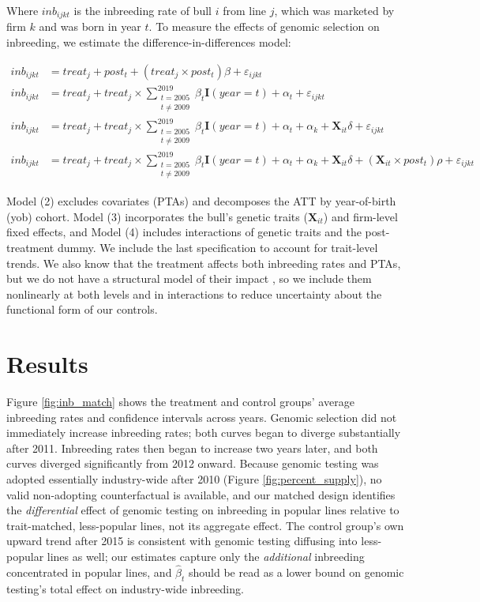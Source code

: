 \documentclass[12pt,letterpaper]{article}
\begin{document}
Where $inb_{ijkt}$ is the inbreeding rate of bull $i$ from line $j$, which was marketed by firm $k$ and was born in year $t$. To measure the effects of genomic selection on inbreeding, we estimate the difference-in-differences model:

\begin{align}
    inb_{ijkt} &= treat_{j}+post_{t}+(treat_{j}\times post_{t})\beta+\varepsilon_{ijkt}\tag{Model 1}\\
    inb_{ijkt} &= treat_{j}+treat_{j}\times\sum_{\substack{t=2005\\t \neq 2009}}^{2019}\beta_{t}\mathbf{I}(year=t)+\alpha_{t}+\varepsilon_{ijkt}\tag{Model 2}\\
    inb_{ijkt} &= treat_{j}+treat_{j}\times\sum_{\substack{t=2005\\t \neq 2009}}^{2019}\beta_{t}\mathbf{I}(year=t)+\alpha_{t}+\alpha_{k}+\mathbf{X}_{it}\delta+\varepsilon_{ijkt}\tag{Model 3}\\
    inb_{ijkt} &= treat_{j}+treat_{j}\times\sum_{\substack{t=2005\\t \neq 2009}}^{2019}\beta_{t}\mathbf{I}(year=t)+\alpha_{t}+\alpha_{k}+\mathbf{X}_{it}\delta+\left(\mathbf{X}_{it}\times post_{t}\right)\rho+\varepsilon_{ijkt}\tag{Model 4}
    \end{align}

Model (2) excludes covariates (PTAs) and decomposes the ATT by year-of-birth (yob) cohort. Model (3) incorporates the bull's genetic traits ($\mathbf{X}_{it}$) and firm-level fixed effects, and Model (4) includes interactions of genetic traits and the post-treatment dummy. We include the last specification to account for trait-level trends. We also know that the treatment affects both inbreeding rates and PTAs, but we do not have a structural model of their impact \citep{Lewbel2019}, so we include them nonlinearly at both levels and in interactions to reduce uncertainty about the functional form of our controls.

\section{Results\label{sec:results}}

Figure \ref{fig:inb_match} shows the treatment and control groups' average inbreeding rates and confidence intervals across years. Genomic selection did not immediately increase inbreeding rates; both curves began to diverge substantially after 2011. Inbreeding rates then began to increase two years later, and both curves diverged significantly from 2012 onward. Because genomic testing was adopted essentially industry-wide after 2010 (Figure \ref{fig:percent_supply}), no valid non-adopting counterfactual is available, and our matched design identifies the \emph{differential} effect of genomic testing on inbreeding in popular lines relative to trait-matched, less-popular lines, not its aggregate effect. The control group's own upward trend after 2015 is consistent with genomic testing diffusing into less-popular lines as well; our estimates capture only the \emph{additional} inbreeding concentrated in popular lines, and $\hat{\beta}_{t}$ should be read as a lower bound on genomic testing's total effect on industry-wide inbreeding.
\end{document}
